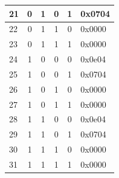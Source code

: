 \begin{table}[]
\begin{tabular}{|l|c|c|c|c|l|}
21                           & 0                       & 1                & 0                & 1                   & 0x0704                         \\ \hline
22                           & 0                       & 1                & 1                & 0                   & 0x0000                         \\ \hline
23                           & 0                       & 1                & 1                & 1                   & 0x0000                         \\ \hline
24                           & 1                       & 0                & 0                & 0                   & 0x0e04                         \\ \hline
25                           & 1                       & 0                & 0                & 1                   & 0x0704                         \\ \hline
26                           & 1                       & 0                & 1                & 0                   & 0x0000                         \\ \hline
27                           & 1                       & 0                & 1                & 1                   & 0x0000                         \\ \hline
28                           & 1                       & 1                & 0                & 0                   & 0x0e04                         \\ \hline
29                           & 1                       & 1                & 0                & 1                   & 0x0704                         \\ \hline
30                           & 1                       & 1                & 1                & 0                   & 0x0000                         \\ \hline
31                           & 1                       & 1                & 1                & 1                   & 0x0000                         \\ \hline
\end{tabular}
\end{table}

